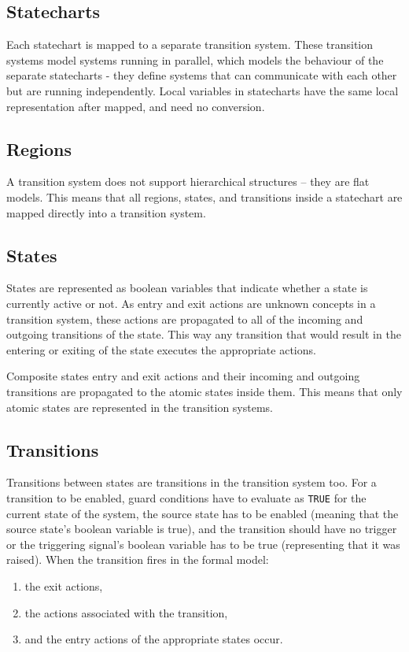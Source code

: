   \subsection{Statecharts}
Each statechart is mapped to a separate transition system. These transition systems model systems running in parallel, which models the behaviour of the separate statecharts - they define systems that can communicate with each other but are running independently. Local variables in statecharts have the same local representation after mapped, and need no conversion.
  \subsection{Regions}
A transition system does not support hierarchical structures -- they are flat models. This means that all regions, states, and transitions inside a statechart are mapped directly into a transition system.
  \subsection{States}
States are represented as boolean variables that indicate whether a state is currently active or not. As entry and exit actions are unknown concepts in a transition system, these actions are propagated to all of the incoming and outgoing transitions of the state. This way any transition that would result in the entering or exiting of the state executes the appropriate actions.

Composite states entry and exit actions and their incoming and outgoing transitions are propagated to the atomic states inside them. This means that only atomic states are represented in the transition systems.
  \subsection{Transitions}
Transitions between states are transitions in the transition system too. For a transition to be enabled, guard conditions have to evaluate as \verb!TRUE! for the current state of the system, the source state has to be enabled (meaning that the source state's boolean variable is true), and the transition should have no trigger or the triggering signal's boolean variable has to be true (representing that it was raised). When the transition fires in the formal model:
\begin{enumerate}
  \item the exit actions,
  \item the actions associated with the transition,
  \item and the entry actions of the appropriate states occur.
\end{enumerate}
